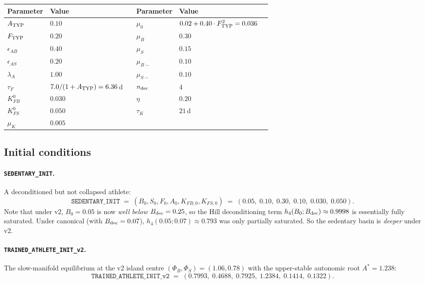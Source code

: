 \documentclass[11pt,a4paper]{article}
\theoremstyle{definition}
\begin{document}
\begin{center}\small
\begin{tabular}{lll lll}
\toprule
Parameter & Value & & Parameter & Value \\
\midrule
$A_{\rm TYP}$    & $0.10$ &  & $\mu_0$          & $0.02 + 0.40 \cdot F_{\rm TYP}^2 = 0.036$ \\
$F_{\rm TYP}$    & $0.20$ &  & $\mu_B$           & $0.30$ \\
$\epsilon_{AB}$  & $0.40$ &  & $\mu_S$           & $0.15$ \\
$\epsilon_{AS}$  & $0.20$ &  & $\mu_{B-}$       & $0.10$ \\
$\lambda_A$      & $1.00$ &  & $\mu_{S-}$       & $0.10$ \\
$\tau_F$         & $7.0/(1 + A_{\rm TYP}) = 6.36$\,d & & $n_{\rm dec}$ & $4$ \\
$K_{FB}^0$       & $0.030$ &  & $\eta$            & $0.20$ \\
$K_{FS}^0$       & $0.050$ &  & $\tau_K$         & $21$\,d \\
$\mu_K$          & $0.005$ &  & & \\
\bottomrule
\end{tabular}
\end{center}

\subsection{Initial conditions}

\paragraph{\texttt{SEDENTARY\_INIT}.} A deconditioned but not collapsed athlete:
\begin{equation}
\boxed{\;
\texttt{SEDENTARY\_INIT} \;=\; (B_0, S_0, F_0, A_0, K_{FB,0}, K_{FS,0}) \;=\; (0.05,\; 0.10,\; 0.30,\; 0.10,\; 0.030,\; 0.050).
\;}
\label{eq:sed-init}
\end{equation}
Note that under v2, $B_0 = 0.05$ is now \emph{well below} $B_{\rm dec} = 0.25$, so the Hill deconditioning term $h_4(B_0; B_{\rm dec}) \approx 0.9998$ is essentially fully saturated. Under canonical (with $B_{\rm dec} = 0.07$), $h_4(0.05; 0.07) \approx 0.793$ was only partially saturated. So the sedentary basin is \emph{deeper} under v2.

\paragraph{\texttt{TRAINED\_ATHLETE\_INIT\_v2}.} The slow-manifold equilibrium at the v2 island centre $(\Phi_B, \Phi_S) = (1.06, 0.78)$ with the upper-stable autonomic root $A^* = 1.238$:
\begin{equation}
\boxed{\;
\texttt{TRAINED\_ATHLETE\_INIT\_v2} \;=\; (0.7993,\; 0.4688,\; 0.7925,\; 1.2384,\; 0.1414,\; 0.1322).
\;}
\label{eq:trained-init-v2}
\end{equation}
\end{document}
